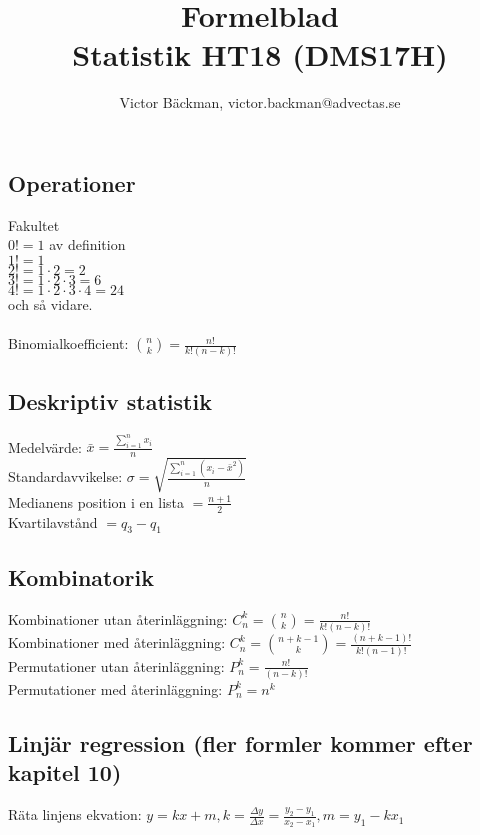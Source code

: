 \documentclass[a4paper,10pt]{article}
\title{Formelblad \\ {\large Statistik HT18 (DMS17H)}}
\author{Victor Bäckman, victor.backman@advectas.se}
\begin{document}
\maketitle

\subsection*{Operationer}
Fakultet\\
$0! = 1$ av definition \\
$1! = 1$ \\
$2! = 1 \cdot 2 = 2$ \\
$3! = 1 \cdot 2 \cdot 3 = 6$ \\
$4! = 1 \cdot 2 \cdot 3 \cdot 4 = 24$ \\
och så vidare.\\
\vspace{1mm} \\
Binomialkoefficient: $\binom{n}{k} = \frac{n!}{k!(n-k)!}$

\subsection*{Deskriptiv statistik}
Medelvärde: $\bar{x} = \frac{\sum_{i=1}^n x_i}{n}$ \\
Standardavvikelse: $\sigma = \sqrt{\frac{\sum_{i=1}^n (x_i - \bar{x}^2)}{n}}$ \\
Medianens position i en lista $= \frac{n+1}{2}$ \\
Kvartilavstånd $=q_3 -q_1$

\subsection*{Kombinatorik}
Kombinationer utan återinläggning: $C_n^k = \binom{n}{k} = \frac{n!}{k!(n-k)!}$ \\
Kombinationer med återinläggning: $C_n^k = \binom{n+k-1}{k} = \frac{(n+k-1)!}{k!(n-1)!}$ \\
Permutationer utan återinläggning: $P_n^k = \frac{n!}{(n-k)!}$ \\
Permutationer med återinläggning: $P_n^k = n^k$

\subsection*{Linjär regression (fler formler kommer efter kapitel 10)}
Räta linjens ekvation: $y = kx + m, k=\frac{\Delta y}{\Delta x} = \frac{y_2 - y_1}{x_2 - x_1}, m=y_1 - kx_1$
\end{document}
